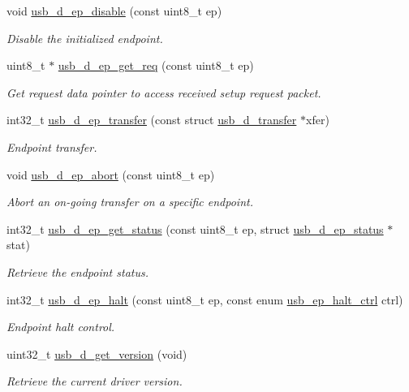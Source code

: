 \begin{DoxyCompactItemize}
void \hyperlink{group__doc__driver__hal__usb__device_gade6576a693b632af3351ac7574356470}{usb\+\_\+d\+\_\+ep\+\_\+disable} (const uint8\+\_\+t ep)
\begin{DoxyCompactList}\small\item\em Disable the initialized endpoint. \end{DoxyCompactList}\item 
uint8\+\_\+t $\ast$ \hyperlink{group__doc__driver__hal__usb__device_ga0373a1bb335936be6c66067c350d2d00}{usb\+\_\+d\+\_\+ep\+\_\+get\+\_\+req} (const uint8\+\_\+t ep)
\begin{DoxyCompactList}\small\item\em Get request data pointer to access received setup request packet. \end{DoxyCompactList}\item 
int32\+\_\+t \hyperlink{group__doc__driver__hal__usb__device_ga25454406209bd4f1f2033f9c920fddb0}{usb\+\_\+d\+\_\+ep\+\_\+transfer} (const struct \hyperlink{structusb__d__transfer}{usb\+\_\+d\+\_\+transfer} $\ast$xfer)
\begin{DoxyCompactList}\small\item\em Endpoint transfer. \end{DoxyCompactList}\item 
void \hyperlink{group__doc__driver__hal__usb__device_ga4d4de7ba6b356e5bbdd0ec37c2dac442}{usb\+\_\+d\+\_\+ep\+\_\+abort} (const uint8\+\_\+t ep)
\begin{DoxyCompactList}\small\item\em Abort an on-\/going transfer on a specific endpoint. \end{DoxyCompactList}\item 
int32\+\_\+t \hyperlink{group__doc__driver__hal__usb__device_gaa6ccd9df460b1f5ee2c10a8203ed0543}{usb\+\_\+d\+\_\+ep\+\_\+get\+\_\+status} (const uint8\+\_\+t ep, struct \hyperlink{structusb__d__ep__status}{usb\+\_\+d\+\_\+ep\+\_\+status} $\ast$stat)
\begin{DoxyCompactList}\small\item\em Retrieve the endpoint status. \end{DoxyCompactList}\item 
int32\+\_\+t \hyperlink{group__doc__driver__hal__usb__device_ga0bca717cd42a112bcce39c20bdda966f}{usb\+\_\+d\+\_\+ep\+\_\+halt} (const uint8\+\_\+t ep, const enum \hyperlink{hpl__usb_8h_a579e31b2de8b2343e818b13c492f30cb}{usb\+\_\+ep\+\_\+halt\+\_\+ctrl} ctrl)
\begin{DoxyCompactList}\small\item\em Endpoint halt control. \end{DoxyCompactList}\item 
uint32\+\_\+t \hyperlink{group__doc__driver__hal__usb__device_ga31a3689de8d913fb54c5ddf2d91840bb}{usb\+\_\+d\+\_\+get\+\_\+version} (void)
\begin{DoxyCompactList}\small\item\em Retrieve the current driver version. \end{DoxyCompactList}\end{DoxyCompactItemize}


